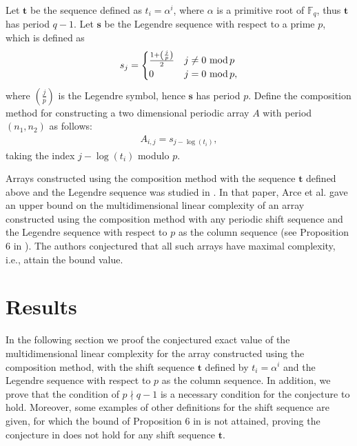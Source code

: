 \documentclass[12pt]{article}
\renewcommand{\mod}{\ \textup{mod}\,}
\theoremstyle{definition}
\theoremstyle{definition}
\theoremstyle{definition}
\theoremstyle{plain}
\theoremstyle{plain}
\numberwithin{equation}{section}
\begin{document}
Let $\mathbf{t}$ be the sequence defined as $t_i = \alpha^i$, where $\alpha$ is a primitive root of $\mathbb{F}_q$, thus $\mathbf{t}$ has period $q-1$.
Let $\mathbf{s}$ be the Legendre sequence with respect to a prime $p$, which is defined as
\[
    s_j = \begin{cases}
        \frac{1+\left(\frac{j}{p}\right)}{2} & j\neq 0 \mod p\\
        0 & j = 0 \mod p,
    \end{cases}
\]
where $\left(\frac{j}{p}\right)$ is the Legendre symbol, hence $\mathbf{s}$ has period $p$.
Define the composition method for constructing a two dimensional periodic array $A$ with period $(n_1,n_2)$ as follows:
\begin{align}\label{composition}\tag{$*$}
    A_{i,j} = s_{j-\log(t_i)},
\end{align}
taking the index $j-\log(t_i)$ modulo $p$.

Arrays constructed using the composition method with the sequence $\mathbf{t}$ defined above and the Legendre sequence was studied in \cite{arce2019multidimensional}. 
In that paper, Arce et al. gave an upper bound on the multidimensional linear complexity of an array constructed using the composition method with any periodic shift sequence and the Legendre sequence with respect to $p$ as the column sequence (see Proposition 6 in \cite{arce2019multidimensional}). 
The authors conjectured that all such arrays have maximal complexity, i.e., attain the bound value. 





\section{Results}
In the following section we proof the conjectured exact value of the multidimensional linear complexity for the array constructed using the composition method, with the shift sequence $\mathbf{t}$ defined by $t_i = \alpha^i$ and the Legendre sequence with respect to $p$ as the column sequence.
In addition, we prove that the condition of $p\nmid q-1$ is a necessary condition for the conjecture to hold.
Moreover, some examples of other definitions for the shift sequence are given, for which the bound of Proposition 6 in \cite{arce2019multidimensional} is not attained, proving the conjecture in \cite{arce2019multidimensional} does not hold for any shift sequence $\mathbf{t}$.
\end{document}
